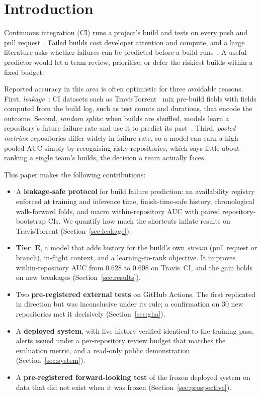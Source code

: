 \documentclass[conference]{IEEEtran}
\newcommand{\tierE}{Tier~E}
\begin{document}
\section{Introduction}

Continuous integration (CI) runs a project's build and tests on every push and pull request~\cite{hilton2016usage}. Failed builds cost developer attention and compute, and a large literature asks whether failures can be predicted before a build runs~\cite{hassan2017change,ni2017cost,xia2017could,chen2020buildfast,jin2020cost}. A useful predictor would let a team review, prioritise, or defer the riskiest builds within a fixed budget.

Reported accuracy in this area is often optimistic for three avoidable reasons. First, \emph{leakage}~\cite{kaufman2012leakage}: CI datasets such as TravisTorrent~\cite{beller2017travistorrent} mix pre-build fields with fields computed from the build log, such as test counts and durations, that encode the outcome. Second, \emph{random splits}: when builds are shuffled, models learn a repository's future failure rate and use it to predict its past~\cite{bergmeir2012use}. Third, \emph{pooled metrics}: repositories differ widely in failure rate, so a model can earn a high pooled AUC simply by recognising risky repositories, which says little about ranking a single team's builds, the decision a team actually faces.

This paper makes the following contributions:
\begin{itemize}
\item A \textbf{leakage-safe protocol} for build failure prediction: an availability registry enforced at training and inference time, finish-time-safe history, chronological walk-forward folds, and macro within-repository AUC with paired repository-bootstrap CIs. We quantify how much the shortcuts inflate results on TravisTorrent (Section~\ref{sec:leakage}).
\item \textbf{\tierE}, a model that adds history for the build's own \emph{stream} (pull request or branch), in-flight context, and a learning-to-rank objective. It improves within-repository AUC from 0.628 to 0.698 on Travis~CI, and the gain holds on new breakages (Section~\ref{sec:results}).
\item Two \textbf{pre-registered external tests} on GitHub Actions. The first replicated in direction but was inconclusive under its rule; a confirmation on 30 new repositories met it decisively (Section~\ref{sec:gha}).
\item A \textbf{deployed system}, with live history verified identical to the training pass, alerts issued under a per-repository review budget that matches the evaluation metric, and a read-only public demonstration (Section~\ref{sec:system}).
\item A \textbf{pre-registered forward-looking test} of the frozen deployed system on data that did not exist when it was frozen (Section~\ref{sec:prospective}).
\end{itemize}
\end{document}

